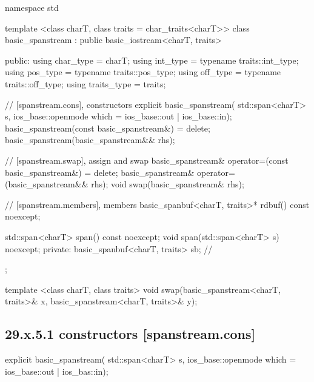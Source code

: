 \documentclass[ebook,11pt,article]{memoir}
\renewcommand{\iref}[1]{[#1]}
\begin{document}
\begin{codeblock}
namespace std {
  template <class charT, class traits = char_traits<charT>>
  class basic_spanstream
    : public basic_iostream<charT, traits> {
  public:
    using char_type      = charT;
    using int_type       = typename traits::int_type;
    using pos_type       = typename traits::pos_type;
    using off_type       = typename traits::off_type;
    using traits_type    = traits;

    // \iref{spanstream.cons}, constructors
    explicit basic_spanstream(
      std::span<charT> s,
      ios_base::openmode which = ios_base::out | ios_base::in);
    basic_spanstream(const basic_spanstream&) = delete;
    basic_spanstream(basic_spanstream&& rhs);

    // \iref{spanstream.swap}, assign and swap
    basic_spanstream& operator=(const basic_spanstream&) = delete;
    basic_spanstream& operator=(basic_spanstream&& rhs);
    void swap(basic_spanstream& rhs);

    // \iref{spanstream.members}, members
    basic_spanbuf<charT, traits>* rdbuf() const noexcept;

    std::span<charT> span() const noexcept;
    void span(std::span<charT> s) noexcept;
  private:
    basic_spanbuf<charT, traits> sb; // \expos
  };

  template <class charT, class traits>
    void swap(basic_spanstream<charT, traits>& x,
              basic_spanstream<charT, traits>& y);
}
\end{codeblock}


\subsection{29.x.5.1  constructors [spanstream.cons]}
\label{spanstream.cons}

\begin{itemdecl}
explicit basic_spanstream(
  std::span<charT> s,
  ios_base::openmode which = ios_base::out | ios_bas::in);
\end{itemdecl}
\end{document}
